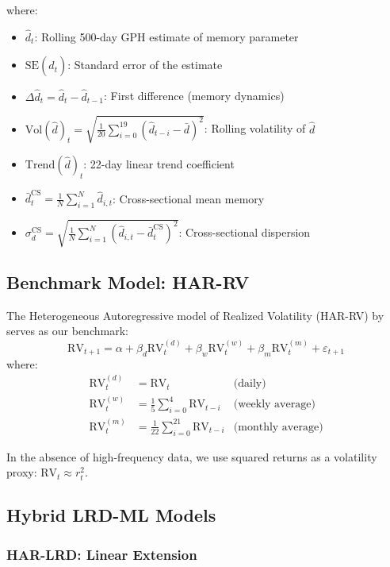 \documentclass[12pt,a4paper]{article}
\newcommand{\RV}{\text{RV}}
\begin{document}
where:
\begin{itemize}
    \item $\hat{d}_t$: Rolling 500-day GPH estimate of memory parameter
    \item $\text{SE}(\hat{d}_t)$: Standard error of the estimate
    \item $\Delta\hat{d}_t = \hat{d}_t - \hat{d}_{t-1}$: First difference (memory dynamics)
    \item $\text{Vol}(\hat{d})_t = \sqrt{\frac{1}{20}\sum_{i=0}^{19}(\hat{d}_{t-i} - \bar{d})^2}$: Rolling volatility of $\hat{d}$
    \item $\text{Trend}(\hat{d})_t$: 22-day linear trend coefficient
    \item $\bar{d}_t^{\text{CS}} = \frac{1}{N}\sum_{i=1}^N \hat{d}_{i,t}$: Cross-sectional mean memory
    \item $\sigma_d^{\text{CS}} = \sqrt{\frac{1}{N}\sum_{i=1}^N (\hat{d}_{i,t} - \bar{d}_t^{\text{CS}})^2}$: Cross-sectional dispersion
\end{itemize}

\subsection{Benchmark Model: HAR-RV}

The Heterogeneous Autoregressive model of Realized Volatility (HAR-RV) by \citet{corsi2009simple} serves as our benchmark:
\begin{equation}
    \RV_{t+1} = \alpha + \beta_d \RV_t^{(d)} + \beta_w \RV_t^{(w)} + \beta_m \RV_t^{(m)} + \varepsilon_{t+1}
\end{equation}
where:
\begin{align}
    \RV_t^{(d)} &= \RV_t & \text{(daily)} \\
    \RV_t^{(w)} &= \frac{1}{5}\sum_{i=0}^{4} \RV_{t-i} & \text{(weekly average)} \\
    \RV_t^{(m)} &= \frac{1}{22}\sum_{i=0}^{21} \RV_{t-i} & \text{(monthly average)}
\end{align}

In the absence of high-frequency data, we use squared returns as a volatility proxy: $\RV_t \approx r_t^2$.

\subsection{Hybrid LRD-ML Models}

\subsubsection{HAR-LRD: Linear Extension}
\end{document}

